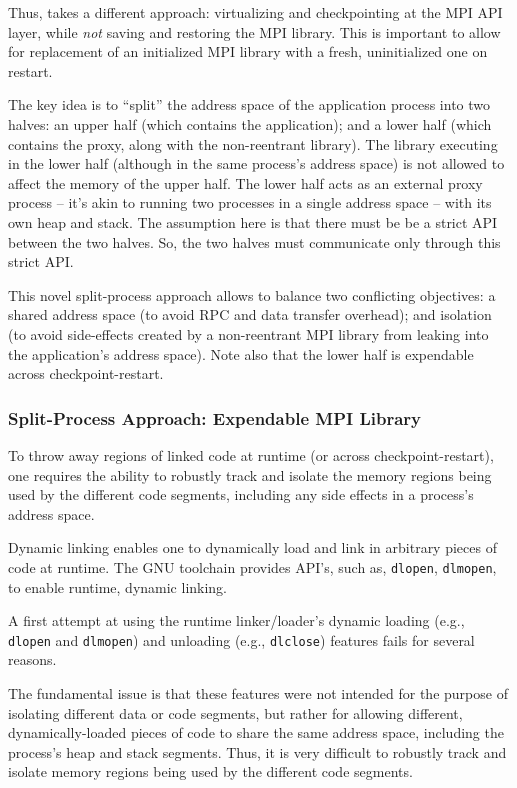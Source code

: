\documentclass[11pt,letter]{article}
\begin{document}
Thus, \mpiSol{} takes a different approach: virtualizing and checkpointing at the
MPI API layer, while {\em not} saving and restoring the MPI library.
This is important to allow for replacement of an initialized MPI library
with a fresh, uninitialized one on restart.


The key idea is to ``split'' the
address space of the application process into two halves: an upper
half (which contains the application); and a lower half (which
contains the proxy, along with the non-reentrant library). The
library executing in the lower half (although in the same process's
address space) is not allowed to affect the memory of the upper
half. The lower half acts as an external proxy process -- it's
akin to running two processes in a single address space -- with its
own heap and stack. The assumption here is that there must be
be a strict API between the two halves. So, the two halves must
communicate only through this strict API.

This novel split-process approach allows \mpiSol{} to balance two
conflicting objectives: a shared address space (to avoid RPC and
data transfer overhead); and isolation (to avoid side-effects created
by a non-reentrant MPI library from leaking into the application's
address space). Note also that the lower half is expendable across
checkpoint-restart.

\subsubsection{Split-Process Approach: Expendable MPI Library}

To throw away regions of linked code at runtime (or across
checkpoint-restart), one requires the ability to robustly track and isolate
the memory regions being used by the different code segments, including any
side effects in a process's address space.

Dynamic linking enables one to dynamically load and link in arbitrary
pieces of code at runtime. The GNU toolchain provides API's, such as,
\texttt{dlopen}, \texttt{dlmopen}, to enable runtime, dynamic linking.

A first attempt at using the runtime linker/loader's dynamic loading
(e.g., \texttt{dlopen} and \texttt{dlmopen}) and unloading (e.g.,
\texttt{dlclose}) features fails for several reasons.

The fundamental issue is that these features were not intended for the
purpose of isolating different data or code segments, but rather for allowing
different, dynamically-loaded pieces of code to share the same address space,
including the process's heap and stack segments. Thus, it is very difficult
to robustly track and isolate memory regions being used by the different
code segments.
\end{document}
